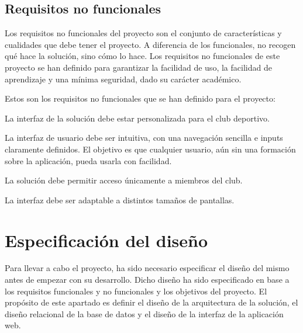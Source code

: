 \subsection{Requisitos no funcionales}

Los requisitos no funcionales del proyecto son el conjunto de características y cualidades que debe tener el proyecto. A diferencia de los funcionales, no recogen qué hace la solución, sino cómo lo hace. Los requisitos no funcionales de este proyecto se han definido para garantizar la facilidad de uso, la facilidad de aprendizaje y una mínima seguridad, dado su carácter académico.

Estos son los requisitos no funcionales que se han definido para el proyecto:

\begin{description}
  [labelindent=2em,
    leftmargin=!,
    labelwidth=1.5cm,
    labelsep=1em,
    font=\normalfont
  ]
  \item[RnF-01] La interfaz de la solución debe estar personalizada para el club deportivo.
  \item[RnF-02] La interfaz de usuario debe ser intuitiva, con una navegación sencilla e inputs claramente definidos. El objetivo es que cualquier usuario, aún sin una formación sobre la aplicación, pueda usarla con facilidad.
  \item[RnF-03] La solución debe permitir acceso únicamente a miembros del club.
  \item[RnF-04] La interfaz debe ser adaptable a distintos tamaños de pantallas.
\end{description}

\section{Especificación del diseño}

Para llevar a cabo el proyecto, ha sido necesario especificar el diseño del mismo antes de empezar con su desarrollo. Dicho diseño ha sido especificado en base a los requisitos funcionales y no funcionales y los objetivos del proyecto. El propósito de este apartado es definir el diseño de la arquitectura de la solución, el diseño relacional de la base de datos y el diseño de la interfaz de la aplicación web.

